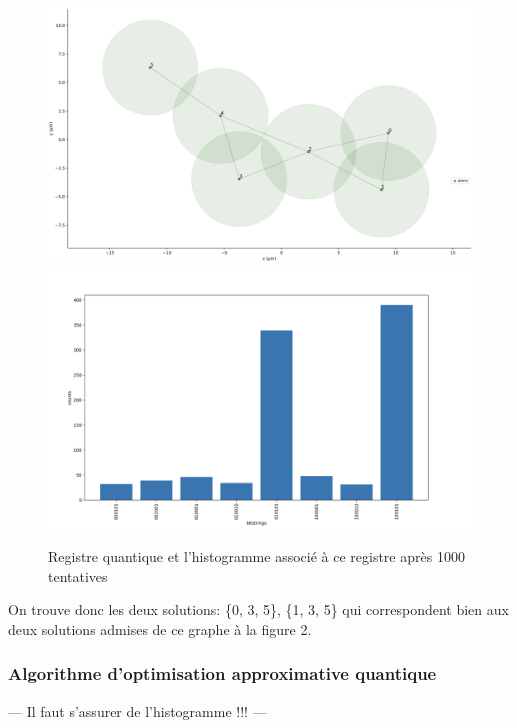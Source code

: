 \documentclass[11pt]{article}
\begin{document}
\begin{figure}[H]
    \centering
    \includegraphics[width = 0.48\linewidth]{images/registre_exemple.png}
    \includegraphics[width=0.49\linewidth]{images/histogram_exemple.png}
    \caption{Registre quantique et l'histogramme associé à ce registre après 1000 tentatives}
    \label{QMIS_exemple}
\end{figure}
    
On trouve donc les deux solutions: \{0, 3, 5\}, \{1, 3, 5\} qui correspondent bien aux deux solutions admises de ce graphe à la figure 2.



\subsubsection{Algorithme d'optimisation approximative quantique} 
--- Il faut s'assurer de l'histogramme !!! ---
 
\end{document}
